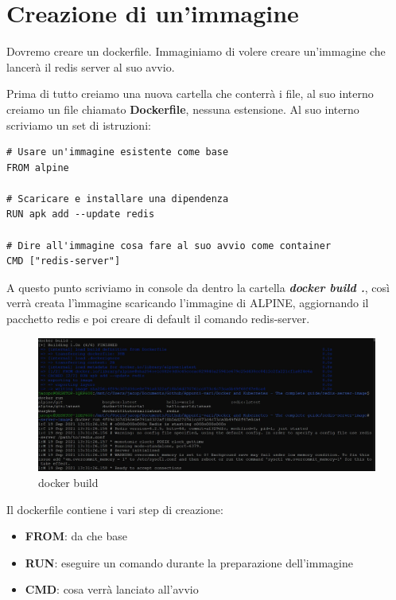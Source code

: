 \documentclass[11pt,a4paper]{book}
\begin{document}
\chapter{Creazione di un'immagine}
Dovremo creare un dockerfile. Immaginiamo di volere creare un'immagine che lancerà il redis server al suo avvio.

Prima di tutto creiamo una nuova cartella che conterrà i file, al suo interno creiamo un file chiamato \textbf{Dockerfile}, nessuna estensione. Al suo interno scriviamo un set di istruzioni:
\begin{lstlisting}
# Usare un'immagine esistente come base
FROM alpine

# Scaricare e installare una dipendenza
RUN apk add --update redis

# Dire all'immagine cosa fare al suo avvio come container
CMD ["redis-server"]
\end{lstlisting}

A questo punto scriviamo in console da dentro la cartella \emph{\textbf{docker build .}}, così verrà creata l'ìmmagine scaricando l'immagine di ALPINE, aggiornando il pacchetto redis e poi creare di default il comando redis-server.

\begin{figure}[h!]
	\begin{center}
		\includegraphics[scale=0.6]{img/008.jpg}
		\caption{docker build}
		\label{fig: 008}
	\end{center}
\end{figure}

Il dockerfile contiene i vari step di creazione:
\begin{itemize}
	\item \textbf{FROM}: da che base
	\item \textbf{RUN}: eseguire un comando durante la preparazione dell'immagine
	\item \textbf{CMD}: cosa verrà lanciato all'avvio
\end{itemize}
\end{document}
